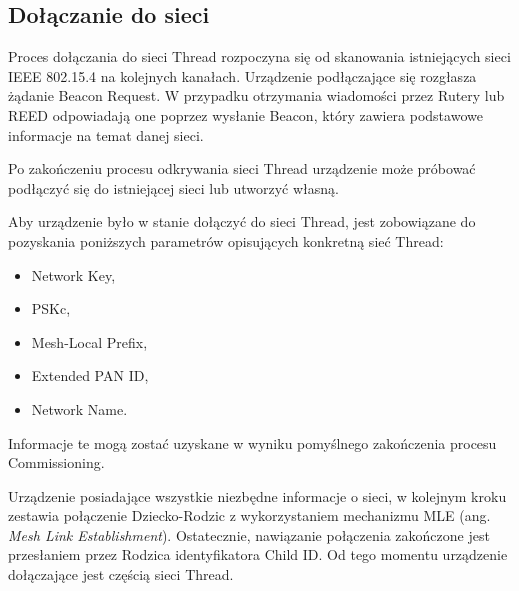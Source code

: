     \subsection{Dołączanie do sieci}

    Proces dołączania do sieci Thread rozpoczyna się od skanowania istniejących sieci IEEE 802.15.4 na kolejnych kanałach. Urządzenie podłączające się rozgłasza żądanie Beacon Request. W przypadku otrzymania wiadomości przez Rutery lub REED odpowiadają one poprzez wysłanie Beacon, który zawiera podstawowe informacje na temat danej sieci.

    Po zakończeniu procesu odkrywania sieci Thread urządzenie może próbować podłączyć się do istniejącej sieci lub utworzyć własną.

    Aby urządzenie było w stanie dołączyć do sieci Thread, jest zobowiązane do pozyskania poniższych parametrów opisujących konkretną sieć Thread:
    \begin{itemize}
        \item Network Key,
        \item PSKc,
        \item Mesh-Local Prefix,
        \item Extended PAN ID,
        \item Network Name.
    \end{itemize}
    
    Informacje te mogą zostać uzyskane w wyniku pomyślnego zakończenia procesu Commissioning.

    Urządzenie posiadające wszystkie niezbędne informacje o sieci, w kolejnym kroku zestawia połączenie Dziecko-Rodzic z wykorzystaniem mechanizmu MLE (ang. \textit{Mesh Link Establishment}). Ostatecznie, nawiązanie połączenia zakończone jest przesłaniem przez Rodzica identyfikatora Child ID. Od tego momentu urządzenie dołączające jest częścią sieci Thread.
















